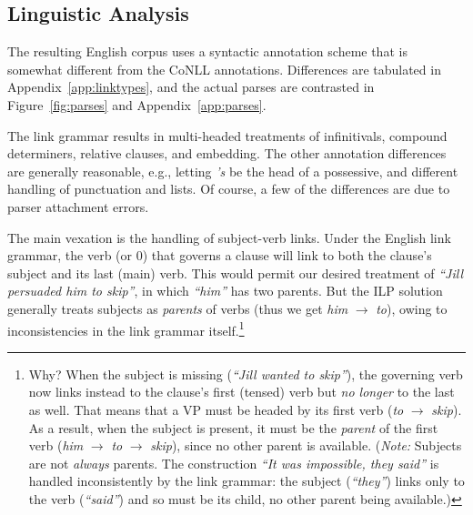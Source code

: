 \documentclass[11pt]{article}
\begin{document}


\subsection{Linguistic Analysis}

The resulting English corpus uses a syntactic annotation scheme that is somewhat different from the CoNLL annotations.  Differences are tabulated in Appendix~\ref{app:linktypes}, and the actual parses are contrasted in Figure~\ref{fig:parses} and Appendix~\ref{app:parses}.

The link grammar results in multi-headed treatments of infinitivals, compound determiners, relative clauses, and embedding.  The other annotation differences are generally reasonable, e.g., letting {\em 's} be the head of a possessive, and different handling of punctuation and lists.  Of course, a few of the differences are due to parser attachment errors.

The main vexation is the handling of subject-verb links.  Under the English link grammar, the verb (or 0) that governs a clause will link to both the clause's subject and its last (main) verb.  This would permit our desired treatment of {\em ``Jill persuaded him to skip''}, in which {\em ``him''} has two parents.  But the ILP solution generally treats subjects as {\em parents} of verbs (thus we get {\em him} $\rightarrow$ {\em to}), owing to inconsistencies in the link grammar itself.\footnote{Why?  When the subject is missing ({\em ``Jill wanted to skip''}), the governing verb now links instead to the clause's first (tensed) verb but {\em no longer} to the last as well.  That means that a VP must be headed by its first verb ({\em to} $\rightarrow$ {\em skip}).  As a result, when the subject is present, it must be the {\em parent} of the first verb ({\em him} $\rightarrow$ {\em to} $\rightarrow$ {\em skip}), since no other parent is available.  ({\em Note:} Subjects are not {\em always} parents.  The construction {\em ``It was impossible, they said''} is handled inconsistently by the link grammar:
the subject ({\em ``they''}) links only to the verb ({\em ``said''}) and so must be its child, no other parent being available.)}
\end{document}
